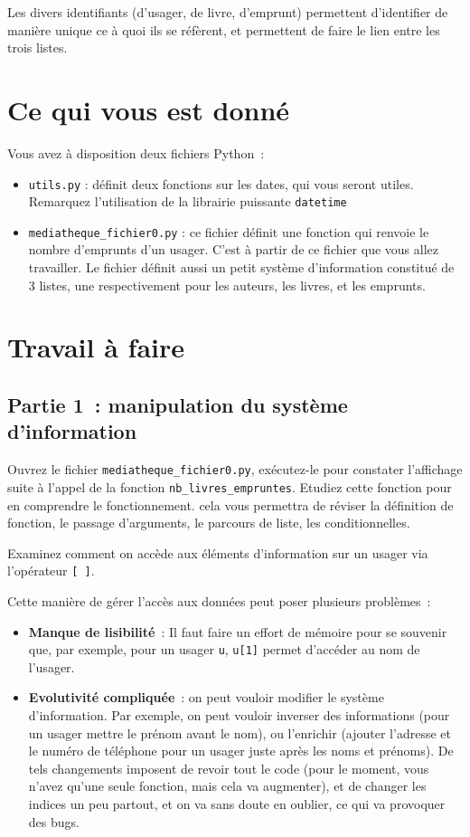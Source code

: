 \documentclass[10pt,a4paper]{sujets-exercices}
\begin{document}
Les divers identifiants (d'usager, de livre, d'emprunt) permettent d'identifier de manière unique ce à quoi ils se réfèrent, et permettent de faire le lien entre les trois listes. 

\section{Ce qui vous est donné}

Vous avez à disposition deux fichiers Python~:

\begin{itemize}
\item \texttt{utils.py} : définit deux fonctions sur les dates, qui vous seront utiles. Remarquez l'utilisation de la librairie puissante \texttt{datetime}
\item \texttt{mediatheque\_fichier0.py} : ce fichier définit une fonction qui renvoie le nombre d'emprunts d'un usager. C'est à partir de ce fichier que vous allez travailler. Le fichier définit aussi un petit système d'information constitué de 3 listes, une respectivement pour les auteurs, les livres, et les emprunts.
\end{itemize}

\section{Travail à faire}


\subsection{Partie 1~: manipulation du système d'information}

Ouvrez le fichier \texttt{mediatheque\_fichier0.py}, exécutez-le pour constater l'affichage suite à l'appel de la fonction \texttt{nb\_livres\_empruntes}. Etudiez cette fonction pour en comprendre le fonctionnement. cela vous permettra de réviser la définition de fonction, le passage d'arguments, le parcours de liste, les conditionnelles. 

Examinez comment on accède aux éléments d'information sur un usager via l'opérateur \verb![ ]!. 

Cette manière de gérer l'accès aux données peut poser plusieurs problèmes~:

\begin{itemize}
\item \textbf{Manque de lisibilité}~: Il faut faire un effort de mémoire pour se souvenir que, par exemple, pour un usager \texttt{u}, \texttt{u[1]} permet d'accéder au nom de l'usager.
\item \textbf{Evolutivité compliquée}~: on peut vouloir modifier le système d'information. Par exemple, on peut vouloir inverser des informations (pour un usager mettre le prénom avant le nom), ou l'enrichir (ajouter l'adresse et le numéro de téléphone pour un usager juste après les noms et prénoms). De tels changements imposent de revoir tout le code (pour le moment, vous n'avez qu'une seule fonction, mais cela va augmenter), et de changer les indices un peu partout, et on va sans doute en oublier, ce qui va provoquer des bugs.
\end{itemize}
\end{document}
